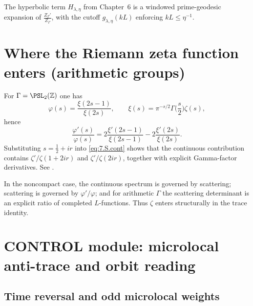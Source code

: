 \begin{remark}\label{rem:7.ZGamma.meaning}
The hyperbolic term $H_{\lambda,\eta}$ from Chapter~6 is a windowed prime-geodesic expansion of $\frac{Z_\Gamma'}{Z_\Gamma}$,
with the cutoff $g_{\lambda,\eta}(kL)$ enforcing $kL\le \eta^{-1}$.
\end{remark}

\section{Where the Riemann zeta function enters (arithmetic groups)}\label{sec:ch7-zeta}

\begin{example}\label{ex:7.modular.surface}
For $\Gamma=\PSL_2(\Z)$ one has
\[
\varphi(s)=\frac{\xi(2s-1)}{\xi(2s)},\qquad
\xi(s)=\pi^{-s/2}\Gamma\!\Big(\frac{s}{2}\Big)\zeta(s),
\]
hence
\[
\frac{\varphi'(s)}{\varphi(s)}
=2\frac{\xi'(2s-1)}{\xi(2s-1)}-2\frac{\xi'(2s)}{\xi(2s)}.
\]
Substituting $s=\tfrac12+ir$ into \eqref{eq:7.S.cont} shows that the continuous contribution contains
$\zeta'/\zeta(1+2ir)$ and $\zeta'/\zeta(2ir)$, together with explicit Gamma-factor derivatives.
See \cite{Hejhal1983,Iwaniec2002}.
\end{example}

\begin{remark}\label{rem:7.zeta.forced}
In the noncompact case, the continuous spectrum is governed by scattering; scattering is governed by $\varphi'/\varphi$;
and for arithmetic $\Gamma$ the scattering determinant is an explicit ratio of completed $L$-functions. Thus $\zeta$ enters
structurally in the trace identity.
\end{remark}

\section{CONTROL module: microlocal anti-trace and orbit reading}\label{sec:ch7-antitrace}

\subsection{Time reversal and odd microlocal weights}\label{subsec:ch7-time-reversal}

